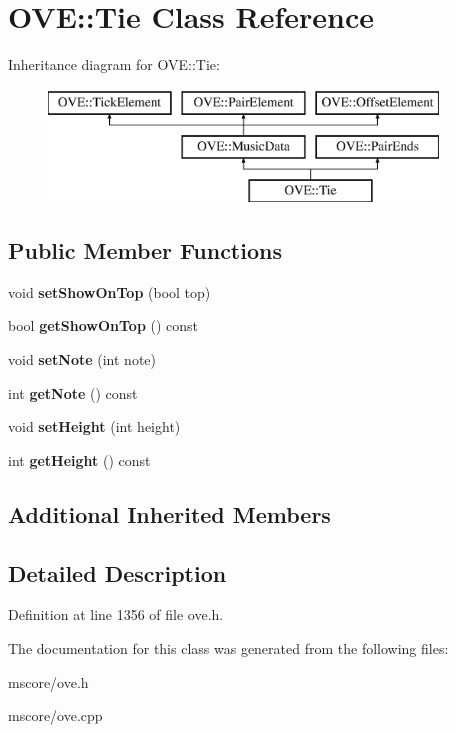 \hypertarget{class_o_v_e_1_1_tie}{}\section{O\+VE\+:\+:Tie Class Reference}
\label{class_o_v_e_1_1_tie}
Inheritance diagram for O\+VE\+:\+:Tie\+:\begin{figure}[H]
\begin{center}
\leavevmode
\includegraphics[height=3.000000cm]{class_o_v_e_1_1_tie}
\end{center}
\end{figure}
\subsection*{Public Member Functions}
\begin{DoxyCompactItemize}
\item 
\mbox{\label{class_o_v_e_1_1_tie_a42215e8bccc34f0886a9b3d64e8c4b1b}} 
void {\bfseries set\+Show\+On\+Top} (bool top)
\item 
\mbox{\label{class_o_v_e_1_1_tie_a74972addfb0f5b89f62f26e9e893212a}} 
bool {\bfseries get\+Show\+On\+Top} () const
\item 
\mbox{\label{class_o_v_e_1_1_tie_ac54ef53481e47efee54bc3f23ae131ee}} 
void {\bfseries set\+Note} (int note)
\item 
\mbox{\label{class_o_v_e_1_1_tie_a23f5473080c9ead1cbf0f5299e4939ec}} 
int {\bfseries get\+Note} () const
\item 
\mbox{\label{class_o_v_e_1_1_tie_acb02444f35ecb660aac0ebb387ae773b}} 
void {\bfseries set\+Height} (int height)
\item 
\mbox{\label{class_o_v_e_1_1_tie_a6c645e2788df60c0dad16aa81ff129c0}} 
int {\bfseries get\+Height} () const
\end{DoxyCompactItemize}
\subsection*{Additional Inherited Members}


\subsection{Detailed Description}


Definition at line 1356 of file ove.\+h.



The documentation for this class was generated from the following files\+:\begin{DoxyCompactItemize}
\item 
mscore/ove.\+h\item 
mscore/ove.\+cpp\end{DoxyCompactItemize}
